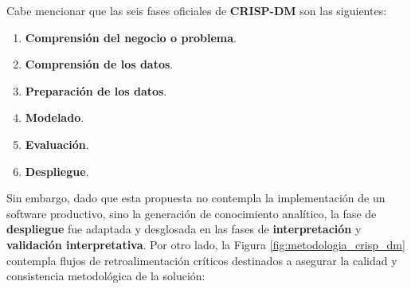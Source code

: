 Cabe mencionar que las seis fases oficiales de \textbf{CRISP-DM} son las siguientes:

\begin{enumerate}
\item \textbf{Comprensión del negocio o problema}.
\item \textbf{Comprensión de los datos}.
\item \textbf{Preparación de los datos}.
\item \textbf{Modelado}.
\item \textbf{Evaluación}.
\item \textbf{Despliegue}.
\end{enumerate}

Sin embargo, dado que esta propuesta no contempla la implementación de un software productivo, sino la generación de conocimiento analítico, la fase de \textbf{despliegue} fue adaptada y desglosada en las fases de \textbf{interpretación} y \textbf{validación interpretativa}. Por otro lado, la Figura \ref{fig:metodologia_crisp_dm} contempla flujos de retroalimentación críticos destinados a asegurar la calidad y consistencia metodológica de la solución:

